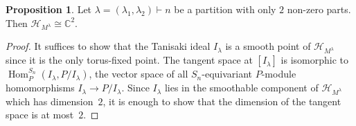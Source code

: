 \documentclass[11pt]{amsart}
\theoremstyle{definition}
\newtheorem{proposition}[theorem]{Proposition}
\newcommand{\CC}{\mathbb{C}}
\newcommand{\HH}{\mathcal{H}}
\DeclareMathOperator{\Hom}{Hom}
\begin{document}
\begin{proposition}\label{prop:m=2}
    Let $\lambda = (\lambda_1,\lambda_2) \vdash n$ be a partition with only $2$ non-zero parts. Then $\HH_{M^\lambda} \cong \CC^2$.
\end{proposition}

\begin{proof}
It suffices to show that the Tanisaki ideal $I_\lambda$ is a smooth point of $\HH_{M^\lambda}$ since it is the only torus-fixed point. The tangent space at $[I_\lambda]$ is isomorphic to $\Hom_{P}^{S_n}(I_\lambda,P/I_\lambda)$, the vector space of all $S_n$-equivariant $P$-module homomorphisms $I_\lambda \rightarrow P/I_\lambda$. Since $I_\lambda$ lies in the smoothable component of $\HH_{M^\lambda}$ which has dimension~$2$, it is enough to show that the dimension of the tangent space is at most~$2$.
		

\end{proof}
\end{document}
